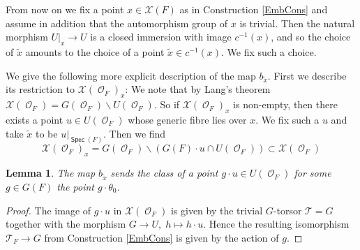 \documentclass{article}
\DeclareMathOperator{\CO}{\mathcal{O}}
\DeclareMathOperator{\Spec}{\mathsf{Spec}}
\newcommand{\CT}{{\mathcal T}}
\newcommand{\CX}{{\mathcal X}}
\theoremstyle{definition}
\theoremstyle{plain}
\newtheorem{lemma}[definition]{Lemma}
\begin{document}
From now on we fix a point $x \in \CX(F)$ as in Construction \ref{EmbCons} and assume in addition that the automorphism group of $x$ is trivial. Then the natural morphism $U|_x \to U$ is a closed immersion with image $c^{-1}(x)$, and so the choice of $\tilde x$ amounts to the choice of a point $\tilde x \in c^{-1}(x)$. We fix such a choice.

We give the following more explicit description of the map $b_{\tilde x}$. First we describe its restriction to $\CX(\CO_F)_x$: We note that by Lang's theorem $\CX(\CO_F)=G(\CO_F) \backslash U(\CO_F)$. So if $\CX(\CO_F)_x$ is non-empty, then there exists a point $u \in U(\CO_F)$ whose generic fibre lies over $x$. We fix such a $u$ and take $\tilde x$ to be $u|_{\Spec(F)}$. Then we find 
\begin{equation*}
    \CX(\CO_F)_x= G(\CO_F) \backslash (G(F)\cdot u \cap U(\CO_F)) \subset \CX(\CO_F)
\end{equation*}

\begin{lemma} \label{bDesc}
    The map $b_{\tilde x}$ sends the class of a point $g\cdot u \in U(\CO_F)$ for some $g \in G(F)$ the point $g \cdot \theta_0$.
\end{lemma}
\begin{proof}
    The image of $g \cdot u$ in $\CX(\CO_F)$ is given by the trivial $G$-torsor $\CT=G$ together with the morphism $G \to U, \; h \mapsto h\cdot u$. Hence the resulting isomorphism $\CT_F \to G$ from Construction \ref{EmbCons} is given by the action of $g$. 
\end{proof}
\end{document}
